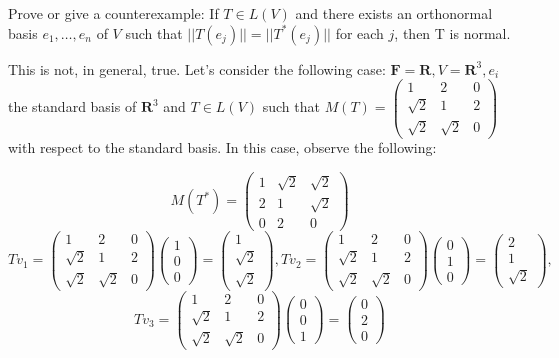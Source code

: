 \begin{exercise}{18}
    Prove or give a counterexample: If $T \in L(V)$ and there exists an orthonormal basis $e_1, \ldots, e_n$ of $V$ such that $\lvert \lvert T(e_j) \rvert \rvert = \lvert \lvert T^*(e_j) \rvert \rvert$ for each $j$, then T is normal.
\end{exercise}

\begin{solution}

    This is not, in general, true. Let's consider the following case: $\mathbf{F} = \mathbf{R}, V = \mathbf{R}^3, e_i$ the standard basis of $\mathbf{R}^3$ and $T \in L(V)$ such that $M(T) = \begin{pmatrix} 1 & 2 & 0 \\ \sqrt{2} & 1 & 2 \\ \sqrt{2} & \sqrt{2} & 0\end{pmatrix}$ with respect to the standard basis. In this case, observe the following:

    $$M(T^*) = \begin{pmatrix} 1 & \sqrt{2} & \sqrt{2} \\ 2 & 1 & \sqrt{2} \\ 0 & 2 & 0 \end{pmatrix}$$
    $$Tv_1 =  \begin{pmatrix} 1 & 2 & 0 \\ \sqrt{2} & 1 & 2 \\ \sqrt{2} & \sqrt{2} & 0\end{pmatrix} \begin{pmatrix} 1 \\ 0 \\ 0 \end{pmatrix} = \begin{pmatrix} 1 \\ \sqrt{2} \\ \sqrt{2} \end{pmatrix}, Tv_2 =  \begin{pmatrix} 1 & 2 & 0 \\ \sqrt{2} & 1 & 2 \\ \sqrt{2} & \sqrt{2} & 0\end{pmatrix} \begin{pmatrix} 0 \\ 1 \\ 0 \end{pmatrix} = \begin{pmatrix} 2 \\ 1 \\ \sqrt{2} \end{pmatrix}, $$
    $$Tv_3 =  \begin{pmatrix} 1 & 2 & 0 \\ \sqrt{2} & 1 & 2 \\ \sqrt{2} & \sqrt{2} & 0\end{pmatrix} \begin{pmatrix} 0 \\ 0 \\ 1 \end{pmatrix} = \begin{pmatrix} 0 \\ 2 \\ 0 \end{pmatrix}$$


\end{solution}
